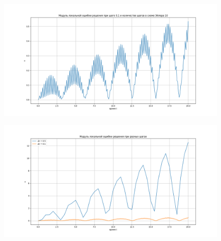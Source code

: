 \documentclass[diploma]{nanolab2015}
\begin{document}
\begin{figure}[h!]
\centering
\includegraphics[scale=0.5]{err 01.png}
\end{figure}

\begin{figure}[h!]
\centering
\includegraphics[scale=0.5]{err t.png}
\end{figure}
\end{document}
